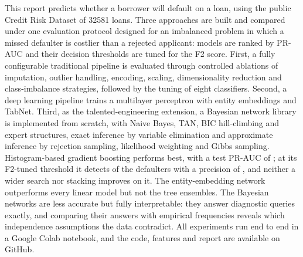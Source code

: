 This report predicts whether a borrower will default on a loan, using the public Credit Risk Dataset of \num{32581} loans.
Three approaches are built and compared under one evaluation protocol designed for an imbalanced problem in which a missed defaulter is costlier than a rejected applicant: models are ranked by PR-AUC and their decision thresholds are tuned for the F2 score.
First, a fully configurable traditional pipeline is evaluated through controlled ablations of imputation, outlier handling, encoding, scaling, dimensionality reduction and class-imbalance strategies, followed by the tuning of eight classifiers.
Second, a deep learning pipeline trains a multilayer perceptron with entity embeddings and TabNet.
Third, as the talented-engineering extension, a Bayesian network library is implemented from scratch, with Naive Bayes, TAN, BIC hill-climbing and expert structures, exact inference by variable elimination and approximate inference by rejection sampling, likelihood weighting and Gibbs sampling.
Histogram-based gradient boosting performs best, with a test PR-AUC of \BestPrAuc{}; at its F2-tuned threshold it detects \BestRecall{} of the defaulters with a precision of \BestPrecision{}, and neither a wider search nor stacking improves on it.
The entity-embedding network outperforms every linear model but not the tree ensembles.
The Bayesian networks are less accurate but fully interpretable: they answer diagnostic queries exactly, and comparing their answers with empirical frequencies reveals which independence assumptions the data contradict.
All experiments run end to end in a Google Colab notebook, and the code, features and report are available on GitHub.
